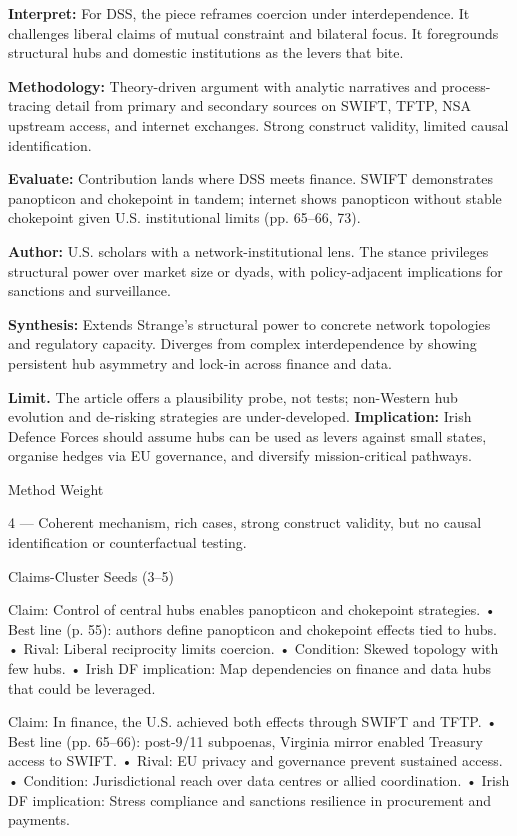 \textbf{Interpret:} For DSS, the piece reframes coercion under interdependence. It challenges liberal claims of mutual constraint and bilateral focus. It foregrounds structural hubs and domestic institutions as the levers that bite.

\textbf{Methodology:} Theory-driven argument with analytic narratives and process-tracing detail from primary and secondary sources on SWIFT, TFTP, NSA upstream access, and internet exchanges. Strong construct validity, limited causal identification.

\textbf{Evaluate:} Contribution lands where DSS meets finance. SWIFT demonstrates panopticon and chokepoint in tandem; internet shows panopticon without stable chokepoint given U.S. institutional limits (pp. 65–66, 73).

\textbf{Author:} U.S. scholars with a network-institutional lens. The stance privileges structural power over market size or dyads, with policy-adjacent implications for sanctions and surveillance.

\textbf{Synthesis:} Extends Strange’s structural power to concrete network topologies and regulatory capacity. Diverges from complex interdependence by showing persistent hub asymmetry and lock-in across finance and data.

\textbf{Limit.} The article offers a plausibility probe, not tests; non-Western hub evolution and de-risking strategies are under-developed. \textbf{Implication:} Irish Defence Forces should assume hubs can be used as levers against small states, organise hedges via EU governance, and diversify mission-critical pathways.

Method Weight

4 — Coherent mechanism, rich cases, strong construct validity, but no causal identification or counterfactual testing.

Claims-Cluster Seeds (3–5)

Claim: Control of central hubs enables panopticon and chokepoint strategies.
• Best line (p. 55): authors define panopticon and chokepoint effects tied to hubs.
• Rival: Liberal reciprocity limits coercion.
• Condition: Skewed topology with few hubs.
• Irish DF implication: Map dependencies on finance and data hubs that could be leveraged.

Claim: In finance, the U.S. achieved both effects through SWIFT and TFTP.
• Best line (pp. 65–66): post-9/11 subpoenas, Virginia mirror enabled Treasury access to SWIFT.
• Rival: EU privacy and governance prevent sustained access.
• Condition: Jurisdictional reach over data centres or allied coordination.
• Irish DF implication: Stress compliance and sanctions resilience in procurement and payments.


